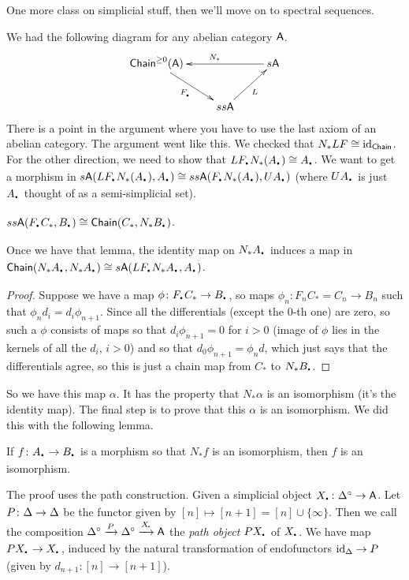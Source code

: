 
One more class on simplicial stuff, then we'll move on to spectral sequences.

We had the following diagram for any abelian category $\text{\sf A}$.
\[\xymatrix{
 \chain^{\ge 0}(\A) \ar[dr]_{F_\udot} & & s\A\ar[ll]_{N_*}\\
 & ss\A\ar[ur]_L
}\]
There is a point in the argument where you have to use the last axiom of an abelian category. The argument went like this. We checked that $N_*LF\cong \operatorname{id}_{\text{\sf Chain}}$. For the other direction, we need to show that $LF_\udot N_*(A_\udot)\cong A_\udot$. We want to get a morphism in $s\A(LF_\udot N_*(A_\udot),A_\udot)\cong ss\A(F_\udot N_*(A_\udot),UA_\udot)$ (where $UA_\udot$ is just $A_\udot$ thought of as a semi-simplicial set).
\begin{lemma}
 $ss\A(F_\udot C_*,B_\udot)\cong \chain(C_*,N_*B_\udot)$.
\end{lemma}
Once we have that lemma, the identity map on $N_* A_\udot$ induces a map in $\chain(N_*A_\udot,N_*A_\udot)\cong s\A(LF_\udot N_* A_\udot,A_\udot)$.
\begin{proof}
 Suppose we have a map $\phi\colon F_\udot C_*\to B_\udot$, so maps $\phi_n\colon F_nC_*=C_n\to B_n$ such that $\phi_n d_i=d_i \phi_{n+1}$. Since all the differentials (except the 0-th one) are zero, so such a $\phi$ consists of maps so that $d_i\phi_{n+1}=0$ for $i>0$ (image of $\phi$ lies in the kernels of all the $d_i$, $i>0$) and so that $d_0\phi_{n+1}=\phi_n d$, which just says that the differentials agree, so this is just a chain map from $C_*$ to $N_*B_\udot$.
\end{proof}
So we have this map $\alpha$. It has the property that $N_*\alpha$ is an isomorphism (it's the identity map). The final step is to prove that this $\alpha$ is an isomorphism. We did this with the following lemma.
\begin{lemma}\label{20L:isos_and_N}
 If $f\colon A_\udot\to B_\udot$ is a morphism so that $N_* f$ is an isomorphism, then $f$ is an isomorphism.
\end{lemma}
The proof uses the path construction. Given a simplicial object $X_\udot\colon \DDelta^\circ \to \A$. Let $P\colon \Delta\to \Delta$ be the functor given by $[n]\mapsto [n+1]=[n]\cup \{\infty\}$. Then we call the composition $\Delta^\circ\xrightarrow P \Delta^\circ \xrightarrow{X_{\!\mbox{\large $\cdot$}\!}} \text{\sf A}$ the \emph{path object} $PX_\udot$ of $X_\udot$. We have map $PX_\udot\to X_\udot$, induced by the natural transformation of endofunctors $\operatorname{id}_{\Delta}\to P$ (given by $d_{n+1}\colon [n]\to [n+1]$).

